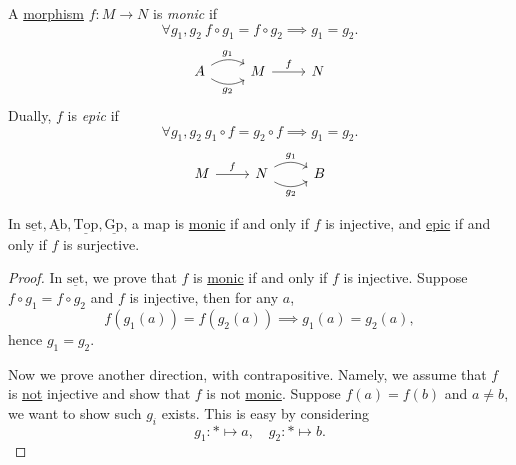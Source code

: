 \begin{definition}\label{def:monic}\label{def:epic}
	A \hyperref[def:morphism]{morphism} \(f\colon M\to N\) is \emph{monic} if
	\[
		\forall g_1, g_2\ f\circ g_1 = f\circ g_2 \implies g_1 = g_2.
	\]
	\[
		\begin{tikzcd}
			A\ar[r, bend left, "g_1"]\ar[r, bend right, "g_2"']& M \ar[r, "f"]& N
		\end{tikzcd}
	\]
	Dually, \(f\) is \emph{epic} if
	\[
		\forall g_1, g_2\ g_{1} \circ f = g_2 \circ f \implies g_1 = g_2.
	\]
	\[
		\begin{tikzcd}
			M\ar[r, "f"]& N\ar[r, bend left, "g_1"]\ar[r, bend right, "g_2"']& B
		\end{tikzcd}
	\]
\end{definition}

\begin{lemma}
	In \(\underline{\mathrm{set}}, \underline{\mathrm{Ab}}, \underline{\mathrm{Top}}, \underline{\mathrm{Gp}}\), a map is \hyperref[def:monic]{monic} if and only
	if \(f\) is injective, and \hyperref[def:epic]{epic} if and only if \(f\) is surjective.
\end{lemma}
\begin{proof}
	In \(\underline{\mathrm{set}}\), we prove that \(f\) is \hyperref[def:monic]{monic} if and only if \(f\) is injective. Suppose
	\(f\circ g_1 = f\circ g_2\) and \(f\) is injective, then for any \(a\),
	\[
		f(g_1(a)) = f(g_2(a))\implies g_1(a) = g_2(a),
	\]
	hence \(g_1 = g_2\).

	\par Now we prove another direction, with contrapositive. Namely, we assume that \(f\) is \underline{not} injective and show that
	\(f\) is not \hyperref[def:monic]{monic}. Suppose \(f(a) = f(b)\) and \(a\neq b\), we want to show such \(g_{i}\) exists. This is easy by considering
	\[
		g_1\colon \ast\mapsto a,\quad g_2\colon \ast\mapsto b.
	\]
\end{proof}


